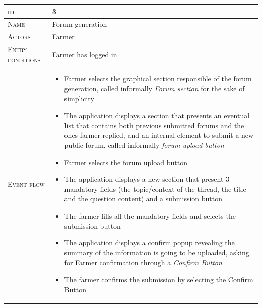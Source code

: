 
\begin{table}[H]
    \centering
    \begin{tabular}{|l|p{}|}
        \hline %
    	\textsc{id}                 &   3\\
    	\hline %
    	\textsc{Name}               &   Forum generation\\
    	\hline %
    	\textsc{Actors}             &   Farmer\\
    	\hline %
    	\textsc{Entry conditions}   &   Farmer has logged in\\
    	\hline %
    	\textsc{Event flow}         &   %
            	                        \begin{itemize}
                                    	    \item Farmer selects the graphical section responsible of the forum generation, called informally \textit{Forum section} for the sake of simplicity
                                    		\item The application displays a section that presents an eventual list that contains both previous submitted forums and the ones farmer replied, and an internal element to submit a new public forum, called informally \textit{forum upload button}
                                    		\item Farmer selects the forum upload button
                                    		\item The application displays a new section that present 3 mandatory fields (the topic/context of the thread, the title and the question content) and a submission button
                                    		\item The farmer fills all the mandatory fields and selects the submission button
                                    		\item The application displays a confirm popup revealing the summary of the information is going to be uploaded, asking for Farmer confirmation through a \textit{Confirm Button}
                                    		\item The farmer confirms the submission by selecting the Confirm Button

\end{itemize}
\end{tabular}
\end{table}
